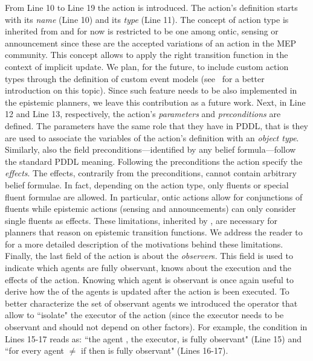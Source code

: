 From Line 10 to Line 19 the action  is introduced.
The action's definition starts with its \emph{name} (Line 10) and its \emph{type} (Line 11).
The concept of {action type} is inherited from \mar and for now is restricted to be one among ontic, sensing or announcement since these are the accepted variations of an action in the MEP community.
This concept allows to apply the right transition function in the context of implicit \knobel update.
We plan, for the future, to include custom action types through the definition of custom event models (see~\cite{baral2015action} for a better introduction on this topic).
Since such feature needs to be also implemented in the epistemic planners, we leave this contribution as a future work.
Next, in Line 12 and Line 13, respectively, the action's \emph{parameters} and \emph{preconditions} are defined.
The {parameters} have the same role that they have in PDDL, that is they are used to associate the variables of the action's definition with an \emph{object type}.
Similarly, also the field {preconditions}---identified by any belief formula---follow the standard PDDL meaning.
Following the {preconditions} the action specify the \emph{effects}.
The {effects}, contrarily from the {preconditions}, cannot contain arbitrary belief formulae.
In fact, depending on the action type, only fluents or special fluent formulae are allowed.
In particular, ontic actions allow for conjunctions of fluents while epistemic actions (\ie sensing and announcements) can only consider single fluents as effects.
These limitations, inherited by \mar, are necessary for planners that reason on epistemic transition functions.
We address the reader to~\cite{Fab20} for a more detailed description of the motivations behind these limitations.
Finally, the last field of the action  is about the \emph{observer}s.
This field is used to indicate which agents are fully observant, \ie knows about the execution and the effects of the action.
Knowing which agent is observant is once again useful to derive how the \knobel of the agents is updated after the action is been executed.
To better characterize the set of observant agents we introduced the operator  that allow to ``isolate" the executor of the action (since the executor needs to be observant and should not depend on other factors).
For example, the condition in Lines 15-17 reads as: ``the agent , \ie the executor, is fully observant" (Line 15) and ``for every agent  $\neq$  if   then  is fully observant" (Lines 16-17).
